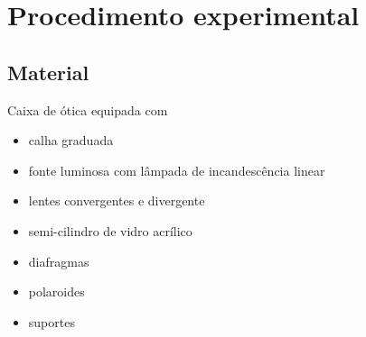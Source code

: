 \documentclass[12pt,a4paper,oneside]{paper}
\begin{document}








\newpage
\section{\sf Procedimento experimental}


\subsection*{\sf Material}
Caixa de ótica equipada com
\begin{itemize}
\item calha graduada
\item fonte luminosa com lâmpada de incandescência linear
\item lentes convergentes e divergente
\item semi-cilindro de vidro acrílico
\item diafragmas
\item polaroides
\item suportes
\end{itemize}
\end{document}
